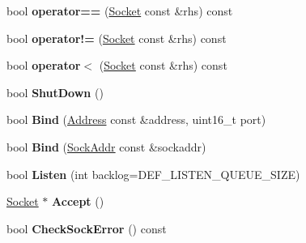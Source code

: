 \begin{DoxyCompactItemize}
\item 
\hypertarget{classlsf_1_1asio_1_1Socket_a597e127dff8028eaed7adea557db4b56}{
bool {\bfseries operator==} (\hyperlink{classlsf_1_1asio_1_1Socket}{Socket} const \&rhs) const }
\label{classlsf_1_1asio_1_1Socket_a597e127dff8028eaed7adea557db4b56}

\item 
\hypertarget{classlsf_1_1asio_1_1Socket_aed6fd7a6762f864756c14fb1d92ff8d0}{
bool {\bfseries operator!=} (\hyperlink{classlsf_1_1asio_1_1Socket}{Socket} const \&rhs) const }
\label{classlsf_1_1asio_1_1Socket_aed6fd7a6762f864756c14fb1d92ff8d0}

\item 
\hypertarget{classlsf_1_1asio_1_1Socket_acc55b7fec90d5ad95d3e424ccada70e7}{
bool {\bfseries operator$<$} (\hyperlink{classlsf_1_1asio_1_1Socket}{Socket} const \&rhs) const }
\label{classlsf_1_1asio_1_1Socket_acc55b7fec90d5ad95d3e424ccada70e7}

\item 
\hypertarget{classlsf_1_1asio_1_1Socket_a759fa2cc2c35f36bfb63706ebfad8f62}{
bool {\bfseries ShutDown} ()}
\label{classlsf_1_1asio_1_1Socket_a759fa2cc2c35f36bfb63706ebfad8f62}

\item 
\hypertarget{classlsf_1_1asio_1_1Socket_aa3fbd05b99f7c0ab350c5633d749e599}{
bool {\bfseries Bind} (\hyperlink{classlsf_1_1asio_1_1Address}{Address} const \&address, uint16\_\-t port)}
\label{classlsf_1_1asio_1_1Socket_aa3fbd05b99f7c0ab350c5633d749e599}

\item 
\hypertarget{classlsf_1_1asio_1_1Socket_a2a00303eafcdefd903e8994a292e7f31}{
bool {\bfseries Bind} (\hyperlink{classlsf_1_1asio_1_1SockAddr}{SockAddr} const \&sockaddr)}
\label{classlsf_1_1asio_1_1Socket_a2a00303eafcdefd903e8994a292e7f31}

\item 
\hypertarget{classlsf_1_1asio_1_1Socket_ab1775b67c31868b47c0b0d87f59d21ce}{
bool {\bfseries Listen} (int backlog=DEF\_\-LISTEN\_\-QUEUE\_\-SIZE)}
\label{classlsf_1_1asio_1_1Socket_ab1775b67c31868b47c0b0d87f59d21ce}

\item 
\hypertarget{classlsf_1_1asio_1_1Socket_a3457c082dab1111d8e83178cfc715a89}{
\hyperlink{classlsf_1_1asio_1_1Socket}{Socket} $\ast$ {\bfseries Accept} ()}
\label{classlsf_1_1asio_1_1Socket_a3457c082dab1111d8e83178cfc715a89}

\item 
\hypertarget{classlsf_1_1asio_1_1Socket_a345b652b6af6da315bc9c31c6b17345a}{
bool {\bfseries CheckSockError} () const }
\label{classlsf_1_1asio_1_1Socket_a345b652b6af6da315bc9c31c6b17345a}


\end{DoxyCompactItemize}
